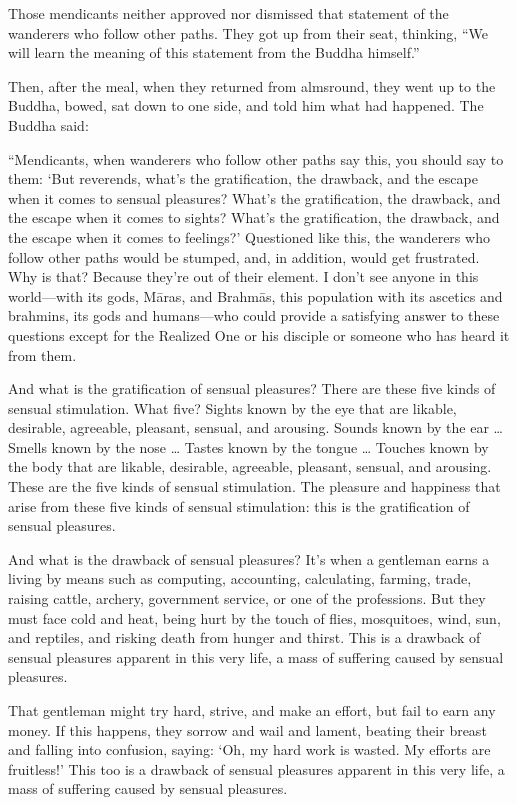 \documentclass[12pt,openany]{book}%
\begin{document}
Those mendicants neither approved nor dismissed that statement of the wanderers who follow other paths. They got up from their seat, thinking, “We will learn the meaning of this statement from the Buddha himself.” 

Then, after the meal, when they returned from almsround, they went up to the Buddha, bowed, sat down to one side, and told him what had happened. The Buddha said: 

“Mendicants, when wanderers who follow other paths say this, you should say to them: ‘But reverends, what’s the gratification, the drawback, and the escape when it comes to sensual pleasures? What’s the gratification, the drawback, and the escape when it comes to sights? What’s the gratification, the drawback, and the escape when it comes to feelings?’ Questioned like this, the wanderers who follow other paths would be stumped, and, in addition, would get frustrated. Why is that? Because they’re out of their element. I don’t see anyone in this world—with its gods, \textsanskrit{Māras}, and \textsanskrit{Brahmās}, this population with its ascetics and brahmins, its gods and humans—who could provide a satisfying answer to these questions except for the Realized One or his disciple or someone who has heard it from them. 

And what is the gratification of sensual pleasures? There are these five kinds of sensual stimulation. What five? Sights known by the eye that are likable, desirable, agreeable, pleasant, sensual, and arousing. Sounds known by the ear … Smells known by the nose … Tastes known by the tongue … Touches known by the body that are likable, desirable, agreeable, pleasant, sensual, and arousing. These are the five kinds of sensual stimulation. The pleasure and happiness that arise from these five kinds of sensual stimulation: this is the gratification of sensual pleasures. 

And what is the drawback of sensual pleasures? It’s when a gentleman earns a living by means such as computing, accounting, calculating, farming, trade, raising cattle, archery, government service, or one of the professions. But they must face cold and heat, being hurt by the touch of flies, mosquitoes, wind, sun, and reptiles, and risking death from hunger and thirst. This is a drawback of sensual pleasures apparent in this very life, a mass of suffering caused by sensual pleasures. 

That gentleman might try hard, strive, and make an effort, but fail to earn any money. If this happens, they sorrow and wail and lament, beating their breast and falling into confusion, saying: ‘Oh, my hard work is wasted. My efforts are fruitless!’ This too is a drawback of sensual pleasures apparent in this very life, a mass of suffering caused by sensual pleasures. 
\end{document}
